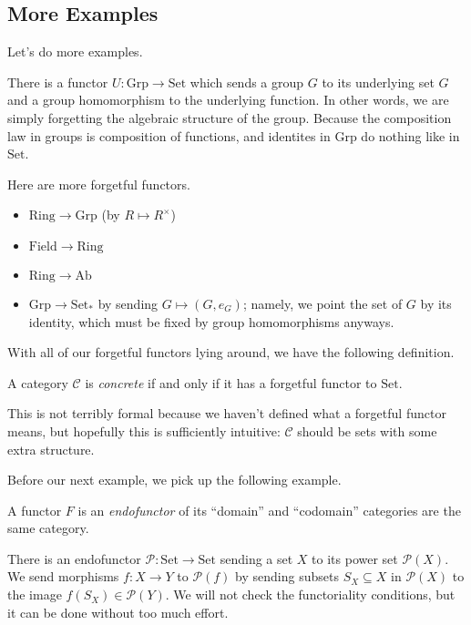 \subsection{More Examples}
Let's do more examples.
\begin{ex}[Forgetful]
	There is a functor $U:\mathrm{Grp}\to\mathrm{Set}$ which sends a group $G$ to its underlying set $G$ and a group homomorphism to the underlying function. In other words, we are simply forgetting the algebraic structure of the group. Because the composition law in groups is composition of functions, and identites in $\mathrm{Grp}$ do nothing like in $\mathrm{Set}$.
\end{ex}
\begin{example}[Forgetful]
	Here are more forgetful functors.
	\begin{itemize}
		\item $\mathrm{Ring}\to\mathrm{Grp}$ (by $R\mapsto R^\times$) 
		\item $\mathrm{Field}\to\mathrm{Ring}$
		\item $\mathrm{Ring}\to\mathrm{Ab}$
		\item $\mathrm{Grp}\to\mathrm{Set}_*$ by sending $G\mapsto(G,e_G)$; namely, we point the set of $G$ by its identity, which must be fixed by group homomorphisms anyways.
	\end{itemize}
\end{example}
With all of our forgetful functors lying around, we have the following definition.
\begin{definition}[Concrete]
	A category $\mathcal C$ is \textit{concrete} if and only if it has a forgetful functor to $\mathrm{Set}$.
\end{definition}
This is not terribly formal because we haven't defined what a forgetful functor means, but hopefully this is sufficiently intuitive: $\mathcal C$ should be sets with some extra structure.

Before our next example, we pick up the following example.
\begin{definition}[Endofunctor]
	A functor $F$ is an \textit{endofunctor} of its ``domain'' and ``codomain'' categories are the same category.
\end{definition}
\begin{example}
	There is an endofunctor $\mathcal P:\mathrm{Set}\to\mathrm{Set}$ sending a set $X$ to its power set $\mathcal P(X)$. We send morphisms $f:X\to Y$ to $\mathcal P(f)$ by sending subsets $S_X\subseteq X$ in $\mathcal P(X)$ to the image $f(S_X)\in\mathcal P(Y)$. We will not check the functoriality conditions, but it can be done without too much effort.
\end{example}

